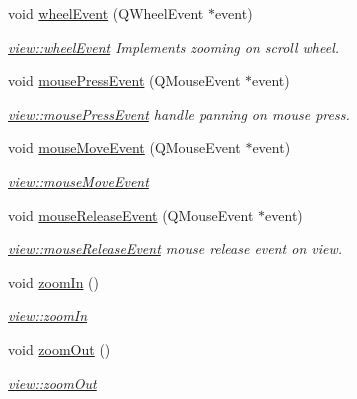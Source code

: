\begin{DoxyCompactItemize}
void \mbox{\hyperlink{classview_a7d18b10e6f370227079c552df12d4c02}{wheel\+Event}} (Q\+Wheel\+Event $\ast$event)
\begin{DoxyCompactList}\small\item\em \mbox{\hyperlink{classview_a7d18b10e6f370227079c552df12d4c02}{view\+::wheel\+Event}} Implements zooming on scroll wheel. \end{DoxyCompactList}\item 
void \mbox{\hyperlink{classview_a7813d1b3e94e3c4db1ec0fa9143a1eca}{mouse\+Press\+Event}} (Q\+Mouse\+Event $\ast$event)
\begin{DoxyCompactList}\small\item\em \mbox{\hyperlink{classview_a7813d1b3e94e3c4db1ec0fa9143a1eca}{view\+::mouse\+Press\+Event}} handle panning on mouse press. \end{DoxyCompactList}\item 
void \mbox{\hyperlink{classview_a165a6cba84a12fc10fbf4c6fee73df73}{mouse\+Move\+Event}} (Q\+Mouse\+Event $\ast$event)
\begin{DoxyCompactList}\small\item\em \mbox{\hyperlink{classview_a165a6cba84a12fc10fbf4c6fee73df73}{view\+::mouse\+Move\+Event}} \end{DoxyCompactList}\item 
void \mbox{\hyperlink{classview_a57902641e912fe7549e04cc6a360d60c}{mouse\+Release\+Event}} (Q\+Mouse\+Event $\ast$event)
\begin{DoxyCompactList}\small\item\em \mbox{\hyperlink{classview_a57902641e912fe7549e04cc6a360d60c}{view\+::mouse\+Release\+Event}} mouse release event on view. \end{DoxyCompactList}\item 
void \mbox{\hyperlink{classview_af0f530013cb69c332de83d47d75a8fb0}{zoom\+In}} ()
\begin{DoxyCompactList}\small\item\em \mbox{\hyperlink{classview_af0f530013cb69c332de83d47d75a8fb0}{view\+::zoom\+In}} \end{DoxyCompactList}\item 
void \mbox{\hyperlink{classview_a497e42c804c9937d94b373d53e163f1b}{zoom\+Out}} ()
\begin{DoxyCompactList}\small\item\em \mbox{\hyperlink{classview_a497e42c804c9937d94b373d53e163f1b}{view\+::zoom\+Out}} \end{DoxyCompactList}\end{DoxyCompactItemize}
